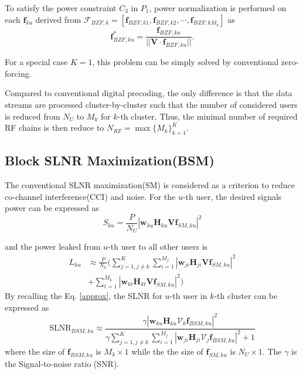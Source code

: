 \documentclass[conference]{IEEEtran}
\begin{document}
To satisfy the power constraint $C_3$ in $P_1$, power normalization is performed on each ${\bm f}_{ku}$ derived from $\bm{\mathcal{F}}_{BZF,k}=\left[\bm{f}_{BZF,k1},\bm{f}_{BZF,k2},\cdots,\bm{f}_{BZF,kM_k}\right]$ as
\begin{equation}\label{eq:ZFU-HBF2}
\bm{f}^*_{BZF,ku} = {\frac{\bm{f}_{BZF,ku}}{||\bm{V}\cdot\bm{f}_{BZF,ku}||}}.
\end{equation}

For a special case $K=1$, this problem can be simply solved by conventional zero-forcing. 

Compared to conventional digital precoding, the only difference is that the data streams are processed cluster-by-cluster such that the number of considered users is reduced from $N_U$ to $M_k$ for $k$-th cluster. Thus, the minimal number of required RF chains is then reduce to $N_{RF} = \max \{M_k\}_{k=1}^K$. 


\subsection{Block SLNR Maximization(BSM)}
The conventional SLNR maximization(SM) is considered as a criterion to reduce co-channel interference(CCI) and noise. For the $u$-th user, the desired signals power can be expressed as 
\begin{equation}
	S_{ku} = \frac{P}{N_U}|\bm{w}_{ku} \bm{H}_{ku} \bm{V} \bm{f}_{SM,ku}|^2
\end{equation}

and the power leaked from $u$-th user to all other users is 
\begin{align}
L_{ku} &\approx \frac{P}{N_U}(\sum_{j=1,j\neq k}^{K}\sum_{i=1}^{M_j}|\bm{w}_{ji} \bm{H}_{ji} \bm{V} \bm{f}_{SM,ku}|^2\nonumber\\ 
&+ \sum_{t=1}^{M_k}|\bm{w}_{kt} \bm{H}_{kt} \bm{V}\bm{f}_{SM,ku}|^2)
\end{align}
By recalling the Eq. \eqref{approx}, the SLNR for $u$-th user in $k$-th cluster can be expressed as
\begin{equation}
	\text{SLNR}_{BSM, ku} \approx \frac{\gamma|\bm{w}_{ku} \bm{H}_{ku} \bm{\mathcal{V}}_k \bm{f}_{BSM,ku}|^2}{\gamma \sum_{j=1,j\neq k}^{K}\sum_{i=1}^{M_j}|\bm{w}_{ji} \bm{H}_{ji} \bm{\mathcal{V}}_j \bm{f}_{BSM,ku}|^2+1}
\end{equation}
where the size of $\bm{f}_{BSM,ku} $ is $M_k\times 1$ while the the size of $\bm{f}_{SM,ku}$ is $N_U \times 1$. The $\gamma$ is the Signal-to-noise ratio (SNR).
\end{document}
